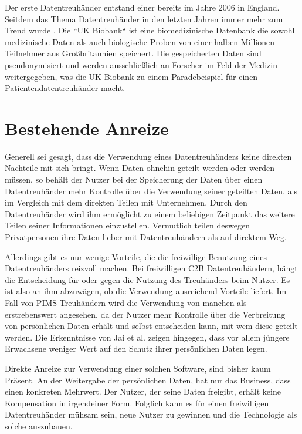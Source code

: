 \documentclass[11pt,a4paper]{scrreprt}
\begin{document}
\cite{dt-blankertz2021regulierung}\cite{dt-blankertz2021neue}\cite{dt-bundesdruckereiDatentreuhänder}

Der erste Datentreuhänder entstand einer bereits im Jahre 2006 in England. Seitdem das Thema Datentreuhänder in den letzten Jahren immer mehr zum Trend wurde \cite{dt-richter2020ddvtalk}. Die ``UK Biobank`` ist eine biomedizinische Datenbank die sowohl medizinische Daten als auch biologische Proben von einer halben Millionen Teilnehmer aus Großbritannien speichert\cite{dt-hardinges2018data}. Die gespeicherten Daten sind pseudonymisiert und werden ausschließlich an Forscher im Feld der Medizin weitergegeben, was die UK Biobank zu einem Paradebeispiel für einen Patientendatentreuhänder macht.


\section{Bestehende Anreize}
Generell sei gesagt, dass die Verwendung eines Datentreuhänders keine direkten Nachteile mit sich bringt. Wenn Daten ohnehin geteilt werden oder werden müssen, so behält der Nutzer bei der Speicherung der Daten über einen Datentreuhänder mehr Kontrolle über die Verwendung seiner geteilten Daten, als im Vergleich mit dem direkten Teilen mit Unternehmen. Durch den Datentreuhänder wird ihm ermöglicht zu einem beliebigen Zeitpunkt das weitere Teilen seiner Informationen einzustellen. Vermutlich teilen deswegen Privatpersonen ihre Daten lieber mit Datentreuhändern als auf direktem Weg. \cite{dt-tresor24study}

Allerdings gibt es nur wenige Vorteile, die die freiwillige Benutzung eines Datentreuhänders reizvoll machen. Bei freiwilligen C2B Datentreuhändern, hängt die Entscheidung für oder gegen die Nutzung des Treuhänders beim Nutzer. Es ist also an ihm abzuwägen, ob die Verwendung ausreichend Vorteile liefert. Im Fall von PIMS-Treuhändern wird die Verwendung von manchen als erstrebenswert angesehen, da der Nutzer mehr Kontrolle über die Verbreitung von persönlichen Daten erhält und selbst entscheiden kann, mit wem diese geteilt werden. Die Erkenntnisse von Jai et al. \cite{dt-jai2016privacy} zeigen hingegen, dass vor allem jüngere Erwachsene weniger Wert auf den Schutz ihrer persönlichen Daten legen.

Direkte Anreize zur Verwendung einer solchen Software, sind bisher kaum Präsent. An der Weitergabe der persönlichen Daten, hat nur das Business, dass einen konkreten Mehrwert. Der Nutzer, der seine Daten freigibt, erhält keine Kompensation in irgendeiner Form. Folglich kann es für einen freiwilligen Datentreuhänder mühsam sein, neue Nutzer zu gewinnen und die Technologie als solche auszubauen.
\end{document}
